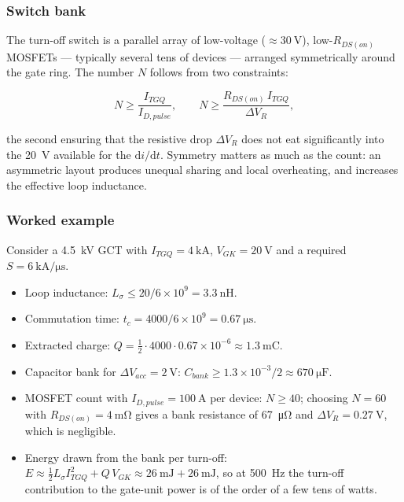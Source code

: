 \subsubsection{Switch bank}

The turn-off switch is a parallel array of low-voltage ($\approx\SI{30}{\volt}$),
low-$R_{DS(on)}$ MOSFETs --- typically several tens of devices --- arranged
symmetrically around the gate ring. The number $N$ follows from two constraints:

\begin{equation}
N \ge \frac{I_{TGQ}}{I_{D,pulse}},
\qquad
N \ge \frac{R_{DS(on)}\, I_{TGQ}}{\Delta V_{R}},
\end{equation}

the second ensuring that the resistive drop $\Delta V_{R}$ does not eat
significantly into the \SI{20}{\volt} available for the $\mathrm{d}i/\mathrm{d}t$.
Symmetry matters as much as the count: an asymmetric layout produces unequal
sharing and local overheating, and increases the effective loop inductance.

\subsubsection{Worked example}

Consider a \SI{4.5}{\kilo\volt} GCT with $I_{TGQ}=\SI{4}{\kilo\ampere}$,
$V_{GK}=\SI{20}{\volt}$ and a required
$S=\SI{6}{\kilo\ampere\per\micro\second}$.

\begin{itemize}[nosep]
  \item Loop inductance: $L_{\sigma}\le 20/6\times10^{9}=\SI{3.3}{\nano\henry}$.
  \item Commutation time: $t_{c}=4000/6\times10^{9}=\SI{0.67}{\micro\second}$.
  \item Extracted charge: $Q=\tfrac12\cdot4000\cdot0.67\times10^{-6}\approx\SI{1.3}{\milli\coulomb}$.
  \item Capacitor bank for $\Delta V_{acc}=\SI{2}{\volt}$:
        $C_{bank}\ge 1.3\times10^{-3}/2 \approx \SI{670}{\micro\farad}$.
  \item MOSFET count with $I_{D,pulse}=\SI{100}{\ampere}$ per device:
        $N\ge 40$; choosing $N=60$ with $R_{DS(on)}=\SI{4}{\milli\ohm}$ gives a
        bank resistance of \SI{67}{\micro\ohm} and $\Delta V_{R}=\SI{0.27}{\volt}$,
        which is negligible.
  \item Energy drawn from the bank per turn-off:
        $E \approx \tfrac12 L_{\sigma} I_{TGQ}^{2} + Q\,V_{GK}
        \approx \SI{26}{\milli\joule} + \SI{26}{\milli\joule}$, so at
        \SI{500}{\hertz} the turn-off contribution to the gate-unit power is of
        the order of a few tens of watts.
\end{itemize}

